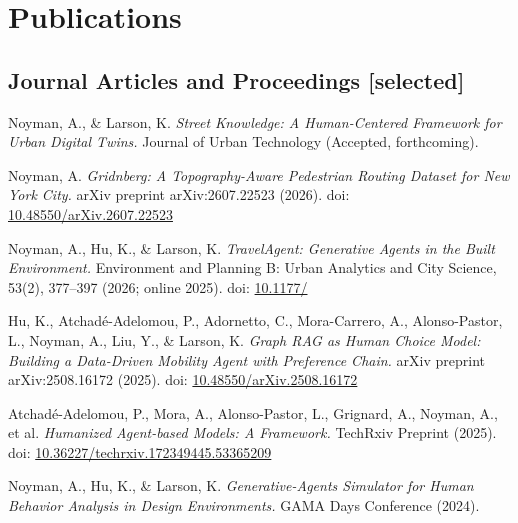 \section*{Publications}

\subsection*{Journal Articles and Proceedings [selected]}

\begin{tablist}

    \item[2026] \tab
    Noyman, A., \& Larson, K.
    \textit{Street Knowledge: A Human-Centered Framework for Urban Digital Twins.}
    Journal of Urban Technology (Accepted, forthcoming).

    \item[2026] \tab
    Noyman, A.
    \textit{Gridnberg: A Topography-Aware Pedestrian Routing Dataset for New York City.}
    arXiv preprint arXiv:2607.22523 (2026).
    doi: \href{https://doi.org/10.48550/arXiv.2607.22523}{10.48550/arXiv.2607.22523}

    \item[2026] \tab
    Noyman, A., Hu, K., \& Larson, K.
    \textit{TravelAgent: Generative Agents in the Built Environment.}
    Environment and Planning B: Urban Analytics and City Science, 53(2), 377--397 (2026; online 2025).
    doi: \href{https://doi.org/10.1177/23998083251360458}{10.1177/}

    \item[2025] \tab
    Hu, K., Atchadé-Adelomou, P., Adornetto, C., Mora-Carrero, A., Alonso-Pastor, L., Noyman, A., Liu, Y., \& Larson, K.
    \textit{Graph RAG as Human Choice Model: Building a Data-Driven Mobility Agent with Preference Chain.}
    arXiv preprint arXiv:2508.16172 (2025).
    doi: \href{https://doi.org/10.48550/arXiv.2508.16172}{10.48550/arXiv.2508.16172}

    \item[2025] \tab
    Atchadé-Adelomou, P., Mora, A., Alonso-Pastor, L., Grignard, A., Noyman, A., et al.
    \textit{Humanized Agent-based Models: A Framework.}
    TechRxiv Preprint (2025).
    doi: \href{https://doi.org/10.36227/techrxiv.172349445.53365209}{10.36227/techrxiv.172349445.53365209}

    \item[2024] \tab
    Noyman, A., Hu, K., \& Larson, K.
    \textit{Generative-Agents Simulator for Human Behavior Analysis in Design Environments.}
    GAMA Days Conference (2024).


\end{tablist}

